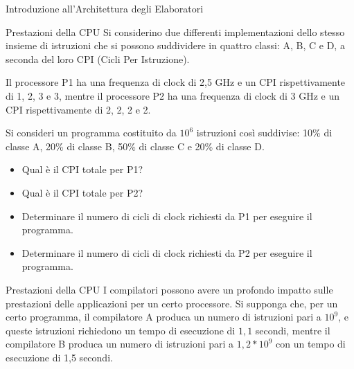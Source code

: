 \documentclass[11pt]{article}
\begin{document}
\begin{quiz}{Introduzione all'Architettura degli Elaboratori}
\begin{cloze}[points=1,shuffle=true]{Prestazioni della CPU}
Si considerino due differenti implementazioni dello stesso insieme di istruzioni che si possono suddividere in quattro classi: A, B, C e D, a
seconda del loro CPI (Cicli Per Istruzione). 

Il processore P1 ha una frequenza di clock di 2,5 GHz e un CPI rispettivamente di 1, 2, 3 e 3, mentre il processore P2 ha una frequenza di clock di 3 GHz e un CPI rispettivamente di 2, 2, 2 e 2.

Si consideri un programma costituito da $10^6$ istruzioni così suddivise: 
10\% di classe A, 20\% di classe B, 50\% di classe C e 20\% di classe D. 

\begin{itemize}
\item Qual è il CPI totale per P1? 
\item Qual è il CPI totale per P2? 
\item Determinare il numero di cicli di clock richiesti da P1 per eseguire il programma.
\item Determinare il numero di cicli di clock richiesti da P2 per eseguire il programma.
\end{itemize}
\end{cloze}

\begin{cloze}[points=1,shuffle=false]{Prestazioni della CPU}
I compilatori possono avere un profondo impatto sulle prestazioni delle applicazioni per un certo processore. Si supponga che, per un certo programma, il compilatore A produca un numero di istruzioni pari a $10^9$, e queste istruzioni richiedono un tempo di esecuzione di $1,1$ secondi, mentre il compilatore B produca un numero di istruzioni pari a $1,2 * 10^9$ con un tempo di esecuzione di 1,5 secondi.


\end{cloze}
\end{quiz}
\end{document}
